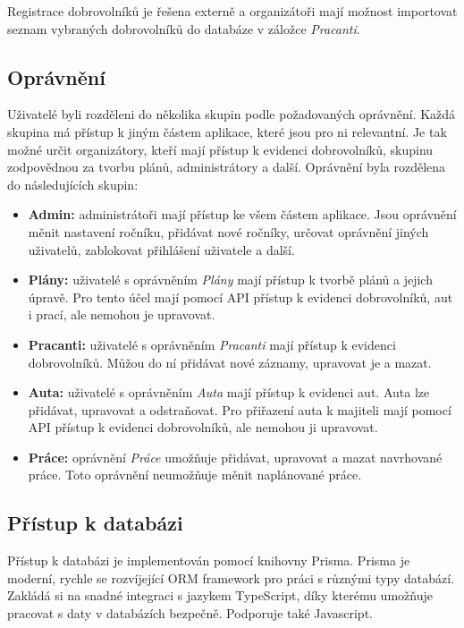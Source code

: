 Registrace dobrovolníků je řešena externě a organizátoři mají možnost importovat seznam vybraných dobrovolníků do databáze v záložce \textit{Pracanti}.

\subsection{Oprávnění}

Uživatelé byli rozděleni do několika skupin podle požadovaných oprávnění. Každá skupina má přístup k jiným částem aplikace, které jsou pro ni relevantní.
Je tak možné určit organizátory, kteří mají přístup k evidenci dobrovolníků, skupinu zodpovědnou za tvorbu plánů, administrátory a další.
Oprávnění byla rozdělena do následujících skupin:

\begin{itemize}
    \item \textbf{Admin:} administrátoři mají přístup ke všem částem aplikace. Jsou oprávnění měnit nastavení ročníku, přidávat nové ročníky, určovat oprávnění jiných uživatelů, zablokovat přihlášení uživatele a další.
    \item \textbf{Plány:} uživatelé s oprávněním \textit{Plány} mají přístup k tvorbě plánů a jejich úpravě. Pro tento účel mají pomocí API přístup k evidenci dobrovolníků, aut i prací, ale nemohou je upravovat.
    \item \textbf{Pracanti:} uživatelé s oprávněním \textit{Pracanti} mají přístup k evidenci dobrovolníků. Můžou do ní přidávat nové záznamy, upravovat je a mazat.
    \item \textbf{Auta:} uživatelé s oprávněním \textit{Auta} mají přístup k evidenci aut. Auta lze přidávat, upravovat a odstraňovat. Pro přiřazení auta k majiteli mají pomocí API přístup k evidenci dobrovolníků, ale nemohou ji upravovat.
    \item \textbf{Práce:} oprávnění \textit{Práce} umožňuje přidávat, upravovat a mazat navrhované práce. Toto oprávnění neumožňuje měnit naplánované práce.
\end{itemize}

\subsection{Přístup k databázi}

Přístup k databázi je implementován pomocí knihovny Prisma. Prisma je moderní, rychle se rozvíjející ORM framework pro práci s různými typy databází. 
Zakládá si na snadné integraci s jazykem TypeScript, díky kterému umožňuje pracovat s daty v databázích bezpečně. Podporuje také Javascript.

